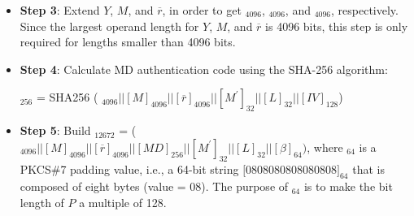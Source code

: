 \documentclass[main\_\_EN.tex]{subfiles}
\begin{document}
\begin{itemize}
    \item \label{Expand big number} {\bfseries Step 3}: Extend \begin{math}Y\end{math}, \begin{math}M\end{math}, and \begin{math}\overline{r}\end{math}, in order to get \begin{math}[Y]_{4096}\end{math}, \begin{math}[M]_{4096}\end{math}, and \begin{math}[\overline{r}]_{4096}\end{math}, respectively. Since the largest operand length for \begin{math}Y\end{math}, \begin{math}M\end{math}, and \begin{math}\overline{r}\end{math} is 4096 bits, this step is only required for lengths smaller than 4096 bits.


    \item \label{Extract MD} {\bfseries Step 4}: Calculate MD authentication code using the SHA-256 algorithm:

    \begin{math}[MD]_{256}\end{math} = SHA256 (
            \begin{math}
                [Y]_{4096} ||
                [M]_{4096} ||
                [\overline{r}]_{4096} ||
                [M^{\prime}]_{32} ||
                [L]_{32} ||
                [IV]_{128}
            \end{math})

    \item \label{Build Plaintext} {\bfseries Step 5}: Build \begin{math}[P]_{12672}\end{math} = (
            \begin{math}
                [Y]_{4096} ||
                [M]_{4096} ||
                [\overline{r}]_{4096} ||
                [MD]_{256} ||
                [M^{\prime}]_{32} ||
                [L]_{32} ||
                [\beta]_{64})
            \end{math}, where \begin{math}[\beta]_{64} \end{math} is a PKCS\#7 padding value, i.e., a 64-bit string $[$\hexprefix{}0808080808080808$]_{64}$ that is composed of eight bytes (value = \hexprefix{}08). The purpose of \begin{math}[\beta]_{64} \end{math} is to make the bit length of \begin{math}P\end{math} a multiple of 128.


\end{itemize}
\end{document}

